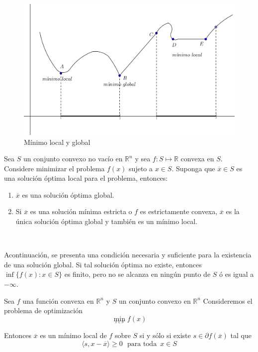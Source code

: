 \begin{figure}
   \centering
   \includegraphics{./partes/sub_sec/codigo-image/minimos.png}
   \caption{M\'inimo local y global \cite{no-lineal}}
   \label{mins}
\end{figure}
\medskip

{\teorema Sea $S$ un conjunto convexo no vac\'io en $\mathbb{R}^n$ y sea $f: S \longmapsto \mathbb{R}$ convexa en $S.$ Considere minimizar el
problema $f(x)$ sujeto a $x \in S.$ Suponga que $\overline{x} \in S$ es una soluci\'on \'optima local para el problema, entonces:
\begin{enumerate}
   \item $\overline{x}$ es una soluci\'on \'optima global.
   \item Si $\overline{x}$ es una soluci\'on m\'inima estricta o $f$ es estrictamente convexa, $\overline{x}$ es la \'unica soluci\'on 
	 \'optima global y tambi\'en es un m\'inimo local.
\end{enumerate} \label{teo1-sol}}
~ \medskip

Acontinuaci\'on, se presenta una condici\'on necesaria y suficiente para la existencia de una soluci\'on global. Si tal soluci\'on \'optima no
existe, entonces $\inf \{f(x): x \in S \}$ es finito, pero no se alcanza en ning\'un punto de $S$ \'o es igual a $- \infty.$

{\teorema Sea $f$ una funci\'on convexa en $\mathbb{R}^n$ y $S$ un conjunto convexo en $\mathbb{R}^n$ Consideremos el problema de 
optimizaci\'on
\[\displaystyle{\min_{_{x \in S}} f(x)}\]

Entonces $\overline{x}$ es un m\'inimo local de $f$ sobre $S$ si y s\'olo si existe $s \in \partial f(\overline{x})$ tal que
\[\langle s, x - \overline{x} \rangle \geqslant 0 \,\, \mbox{ para toda } \, x \in S\]  \label{teo-important}}
\medskip

